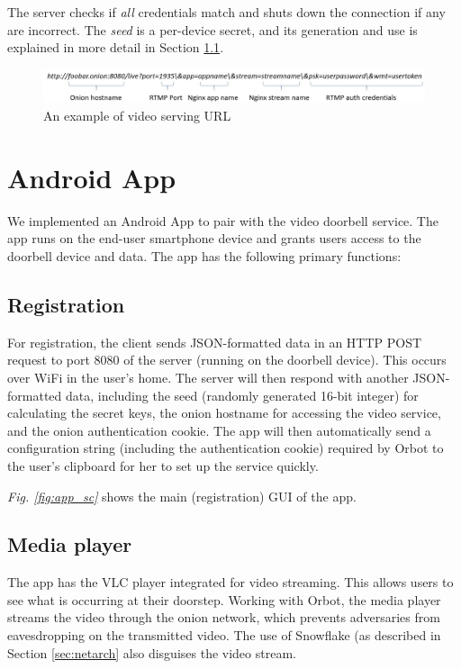 The server checks if \textit{all} credentials match and shuts down the connection if any are incorrect. The \textit{seed} is a per-device secret, and its generation and use is explained in more detail in Section \ref{sec:registration}.

\begin{figure}
	\includegraphics[width=\linewidth]{fig_url.jpg}
	\caption{An example of video serving URL}
	\label{fig:url}
\end{figure}



\section{Android App}
We implemented an Android App to pair with the video doorbell service. The app runs on the end-user smartphone device and grants users access to the doorbell device and data. The app has the following primary functions:

\subsection{Registration} 
\label{sec:registration}
For registration, the client sends JSON-formatted data in an HTTP POST request to port 8080 of the server (running on the doorbell device). This occurs over WiFi in the user's home. The server will then respond with another JSON-formatted data, including the seed (randomly generated 16-bit integer) for calculating the secret keys, the onion hostname for accessing the video service, and the onion authentication cookie. The app will then automatically send a configuration string (including the authentication cookie) required by Orbot to the user’s clipboard for her to set up the service quickly. 

\textit{Fig. \ref{fig:app_sc}} shows the main (registration) GUI of the app.


\subsection{Media player} The app has the VLC player integrated for video streaming. This allows users to see what is occurring at their doorstep. Working with Orbot, the media player streams the video through the onion network, which prevents adversaries from eavesdropping on the transmitted video. The use of Snowflake (as described in Section \ref{sec:netarch} also disguises the video stream.

